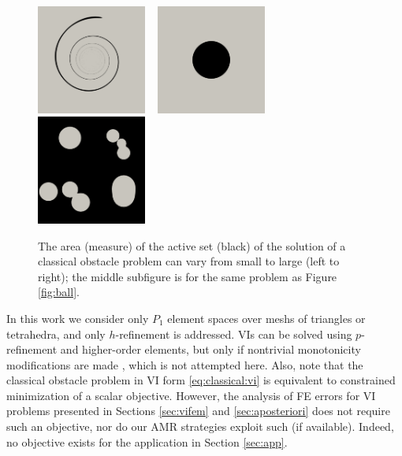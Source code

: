 \documentclass[]{interact}
\theoremstyle{plain}%
\theoremstyle{definition}
\theoremstyle{remark}
\begin{document}
\begin{figure}[ht]
\noindent \hspace{-1mm} \mbox{\includegraphics[width=0.32\textwidth]{static/spiral.png} \,
\includegraphics[width=0.32\textwidth]{static/sphere.png} \,
\includegraphics[width=0.32\textwidth]{static/blisters.png}}
\caption{The area (measure) of the active set (black) of the solution of a classical obstacle problem can vary from small to large (left to right); the middle subfigure is for the same problem as Figure \ref{fig:ball}.}
\label{fig:activesizes}
\end{figure}

In this work we consider only $P_1$ element spaces over meshs of triangles or tetrahedra, and only $h$-refinement is addressed.  VIs can be solved using $p$-refinement and higher-order elements, but only if nontrivial monotonicity modifications are made \cite{KeithSurowiec2024}, which is not attempted here.  Also, note that the classical obstacle problem in VI form \eqref{eq:classical:vi} is equivalent to constrained minimization of a scalar objective.  However, the analysis of FE errors for VI problems presented in Sections \ref{sec:vifem} and \ref{sec:aposteriori} does not require such an objective, nor do our AMR strategies exploit such (if available).  Indeed, no objective exists for the application in Section \ref{sec:app}.
\end{document}
